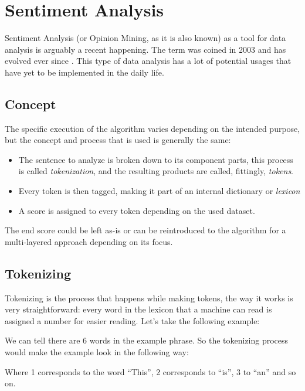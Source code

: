 \section{Sentiment Analysis}
Sentiment Analysis (or Opinion Mining, as it is also known) as a tool for data analysis is arguably a recent happening. The term was coined in 2003 and has evolved ever since \citep{rf3}.
This type of data analysis has a lot of potential usages that have yet to be implemented in the daily life.

\subsection{Concept}
The specific execution of the algorithm varies depending on the intended purpose, but the concept and process that is used is generally the same:
\begin{itemize}
	\item The sentence to analyze is broken down to its component parts, this process is called \textit{tokenization}, and the resulting products are called, fittingly, \textit{tokens}.
	\item Every token is then tagged, making it part of an internal dictionary or \textit{lexicon}
	\item A score is assigned to every token depending on the used dataset.
\end{itemize}
The end score could be left as-is or can be reintroduced to the algorithm for a multi-layered approach depending on its focus. \citep{rf4}

\subsection{Tokenizing}
Tokenizing is the process that happens while making tokens, the way it works is very straightforward: every word in the lexicon that a machine can read is assigned a number for easier reading. Let's take the following example:
\begin{center}
\end{center}

We can tell there are 6 words in the example phrase. So the tokenizing process would make the example look in the following way:
\begin{center}
\end{center}

Where 1 corresponds to the word ``This'', 2 corresponds to ``is'', 3 to ``an'' and so on.

